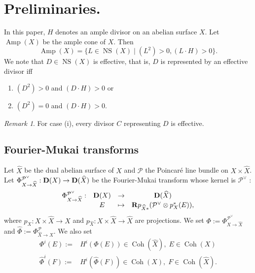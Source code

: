 \documentclass[10pt]{amsart}
\def\cal{\mathcal}
\newcommand{\Coh}{\operatorname{Coh}}
\newcommand{\NS}{\operatorname{NS}}
\newcommand{\Amp}{\operatorname{Amp}}
\numberwithin{equation}{section}
\theoremstyle{plain}
\theoremstyle{definition}
\theoremstyle{remark}
\newtheorem{rem}[thm]{Remark}
\begin{document}
\section{Preliminaries.}\label{sect:pre}


In this paper, $H$ denotes an ample divisor on an abelian surface $X$.  
Let $\Amp(X)$ be the ample cone of $X$.
Then
$$
\Amp(X)=\{L \in \NS(X) \mid (L^2)>0, (L \cdot H)>0 \}.
$$
%
We note that
$D \in \NS(X)$ is effective, that is,
$D$ is represented by an effective divisor iff
\begin{enumerate}
\item
$(D^2)>0$ and $(D \cdot H)>0$ or
\item
$(D^2)=0$ and $(D \cdot H)>0$.
\end{enumerate}



\begin{rem}
For case (i), every divisor $C$ representing $D$ is effective. 
\end{rem}


\subsection{Fourier-Mukai transforms}
Let $\widehat{X}$ be the dual abelian surface of $X$ and
${\cal P}$ the Poincar\'{e} line bundle on $X \times \widehat{X}$.
Let $\Phi_{X \to \widehat{X}}^{{\cal P}^{\vee}}:{\bf D}(X) \to {\bf D}(\widehat{X})$
be the Fourier-Mukai transform whose kernel is ${\cal P}^{\vee}$ \cite{Mukai:1981}:
\begin{equation}
\begin{matrix}
\Phi_{X \to \widehat{X}}^{{\cal P}^{\vee}}: & {\bf D}(X) & \to & {\bf D}(\widehat{X})\\
& E & \mapsto & {\bf R}p_{\widehat{X}*}({\cal P}^{\vee} \otimes p_X^*(E)),
\end{matrix}
\end{equation}
where $p_X:X \times \widehat{X} \to X$ and
$p_{\widehat{X}}:X \times \widehat{X} \to \widehat{X}$
are projections.
We set
$\Phi:=\Phi_{X \to \widehat{X}}^{{\cal P}^{\vee}}$ and
$\widehat{\Phi}:=\Phi_{\widehat{X} \to X}^{{\cal P}}$.
We also set 
\begin{equation}
\begin{split}
\Phi^i(E):=& H^i(\Phi(E)) \in \Coh(\widehat{X}),\; E \in \Coh(X)\\
\widehat{\Phi}^i(F):=& H^i(\widehat{\Phi}(F)) \in \Coh(X),\;F \in \Coh(\widehat{X}).
\end{split}
\end{equation}
\end{document}
